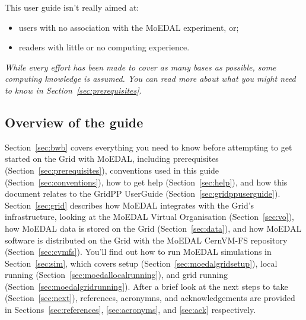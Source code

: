 This user guide isn't really aimed at:

\begin{itemize}
\item users with no association with the \ac{MoEDAL} experiment, or;
\item readers with little or no computing experience.
\end{itemize}

\begin{tcolorbox}[title=Computing knowledge]
\emph{While every effort has been made to cover as many
bases as possible, some computing knowledge is
assumed. You can read more about what you might need to know in
Section~\ref{sec:prerequisites}}.
\end{tcolorbox}

\newpage

\subsection{Overview of the guide}
\label{sec:overview}
Section~\ref{sec:bwb} covers everything you need to know before
attempting to get started on the Grid with MoEDAL, including
prerequisites (Section~\ref{sec:prerequisites}),
conventions used in this guide (Section~\ref{sec:conventions}),
how to get help (Section~\ref{sec:help}),
and
how this document relates to the GridPP UserGuide (Section~\ref{sec:gridppuserguide}).
%
Section~\ref{sec:grid} describes how MoEDAL integrates with the Grid's
infrastructure, looking at the MoEDAL Virtual Organisation (Section~\ref{sec:vo}),
how MoEDAL data is stored on the Grid (Section~\ref{sec:data}),
and
how MoEDAL software is distributed on the Grid with the
MoEDAL CernVM-FS repository (Section~\ref{sec:cvmfs}).
%
You'll find out how to run MoEDAL simulations in
Section~\ref{sec:sim},
which covers setup (Section~\ref{sec:moedalgridsetup}),
local running (Section~\ref{sec:moedallocalrunning}),
and
grid running (Section~\ref{sec:moedalgridrunning}).
%
After a brief look at the next steps to take (Section~\ref{sec:next}),
references, acronymns, and acknowledgements are provided in
Sections~\ref{sec:references}, \ref{sec:acronyms}, and
\ref{sec:ack} respectively.
